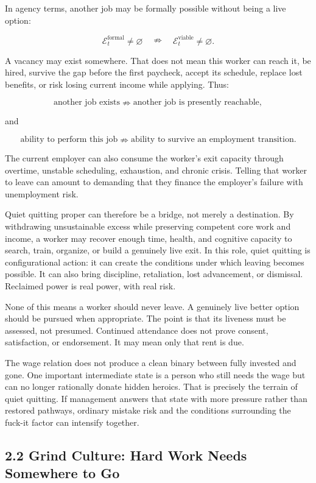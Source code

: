 \documentclass[11pt,oneside]{article}
\begin{document}
In agency terms, another job may be formally possible without being a
live option:

\[
\mathcal E_t^{\mathrm{formal}}\neq\varnothing
\quad\nRightarrow\quad
\mathcal E_t^{\mathrm{viable}}\neq\varnothing.
\]

A vacancy may exist somewhere. That does not mean this worker can reach
it, be hired, survive the gap before the first paycheck, accept its
schedule, replace lost benefits, or risk losing current income while
applying. Thus:

\[
\text{another job exists}
\nRightarrow
\text{another job is presently reachable},
\]

and

\[
\text{ability to perform this job}
\nRightarrow
\text{ability to survive an employment transition}.
\]

The current employer can also consume the worker's exit capacity through
overtime, unstable scheduling, exhaustion, and chronic crisis. Telling
that worker to leave can amount to demanding that they finance the
employer's failure with unemployment risk.

Quiet quitting proper can therefore be a bridge, not merely a
destination. By withdrawing unsustainable excess while preserving
competent core work and income, a worker may recover enough time,
health, and cognitive capacity to search, train, organize, or build a
genuinely live exit. In this role, quiet quitting is configurational
action: it can create the conditions under which leaving becomes
possible. It can also bring discipline, retaliation, lost advancement,
or dismissal. Reclaimed power is real power, with real risk.

None of this means a worker should never leave. A genuinely live better
option should be pursued when appropriate. The point is that its
liveness must be assessed, not presumed. Continued attendance does not
prove consent, satisfaction, or endorsement. It may mean only that rent
is due.

The wage relation does not produce a clean binary between fully invested
and gone. One important intermediate state is a person who still needs
the wage but can no longer rationally donate hidden heroics. That is
precisely the terrain of quiet quitting. If management answers that
state with more pressure rather than restored pathways, ordinary mistake
risk and the conditions surrounding the fuck-it factor can intensify
together.

\hypertarget{grind-culture-hard-work-needs-somewhere-to-go}{%
\subsection{2.2 Grind Culture: Hard Work Needs Somewhere to
Go}\label{grind-culture-hard-work-needs-somewhere-to-go}}
\end{document}

